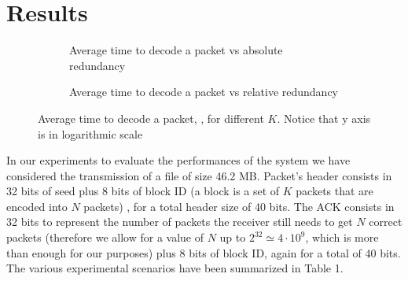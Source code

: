 \section{Results}\label{sec:results}
\setlength{\abovecaptionskip}{0pt plus 0pt minus 2pt}

\begin{figure}[t!]
\centering
\captionsetup{justification=centering,font=scriptsize}
\begin{subfigure}{0.4\textwidth}
	\captionsetup{justification=centering,font=scriptsize}
	\setlength{}
	\setlength{}
	
	\caption{Average time to decode a packet vs absolute redundancy}
	\label{fig:decoding_time}
\end{subfigure}\hspace{2em}%
\begin{subfigure}{0.4\textwidth}
	\captionsetup{justification=centering,font=scriptsize}
	\setlength{}
	\setlength{}
	
	\caption{Average time to decode a packet vs relative redundancy}
	\label{fig:decoding_time_rel}
\end{subfigure}
\caption{Average time to decode a packet, , for different $K$. Notice that y axis is in logarithmic scale}
\label{fig:dc_all}
\end{figure}

In our experiments to evaluate the performances of the system we have considered the transmission of a file of size 46.2 MB. Packet's header consists in 32 bits of  seed plus 8 bits of block ID (a block is a set of $K$ packets that are encoded into $N$ packets) , for a total header size of 40 bits. The ACK consists in 32 bits to represent the number of packets the receiver still needs to get $N$ correct packets (therefore we allow for a value of $N$ up to $2^{32}\simeq 4\cdot 10^9$, which is more than enough for our purposes) plus 8 bits of block ID, again for a total of 40 bits. The various experimental scenarios have been summarized in Table 1.

